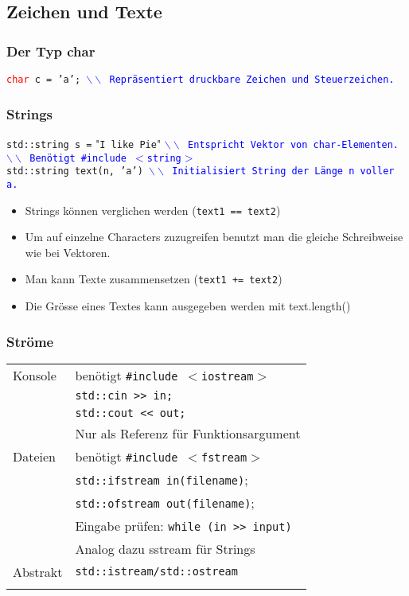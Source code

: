 \documentclass[a3paper, 10pt, landscape]{scrartcl}
\newcommand{\code}[1]{\texttt{#1}}
\begin{document}
\begin{multicols*}{3}
	\subsection{Zeichen und Texte}
	
	\subsubsection{Der Typ char}
	\vspace{0.1cm}
	\code{\textcolor{red}{char} c = 'a'; \textcolor{blue}{$\backslash \backslash$ Repräsentiert druckbare Zeichen und Steuerzeichen.}\\}
	
	\subsubsection{Strings}
	\code{std::string s =} "\code{I like Pie}" \space\code{\textcolor{blue}{$\backslash \backslash$ Entspricht Vektor von char-Elementen.}\\
	\phantom{std::string s = II like Pie }\space\textcolor{blue}{$\backslash \backslash$ Benötigt \#include $<$string$>$}}\\
	
	\code{std::string text(n, 'a') \textcolor{blue}{$\backslash \backslash$ Initialisiert String der Länge n voller a.}}\\
	
	\begin{itemize}
		\item Strings können verglichen werden (\code{text1 == text2})
	\item Um auf einzelne Characters zuzugreifen benutzt man die gleiche Schreibweise wie bei Vektoren.
	\item Man kann Texte zusammensetzen (\code{text1 += text2})
	\item Die Grösse eines Textes kann ausgegeben werden mit text.length()
	\end{itemize}
	
	\subsubsection{Ströme}
	\begin{tabular}{l l}
		Konsole & benötigt \code{\#include $<$iostream$>$}\\
		& \code{std::cin >> in;} \\
		& \code{std::cout << out;} \\
		& Nur als Referenz für Funktionsargument\\
		\hline
		Dateien & benötigt \code{\#include $<$fstream$>$}\\
		& \code{std::ifstream in(filename)};\\
		& \code{std::ofstream out(filename)};\\
		& Eingabe prüfen: \code{while (in >> input)}\\
		& Analog dazu sstream für Strings\\
		\hline
		Abstrakt & \code{std::istream/std::ostream}\\
		& \\
		

\end{tabular}
\end{multicols*}
\end{document}
